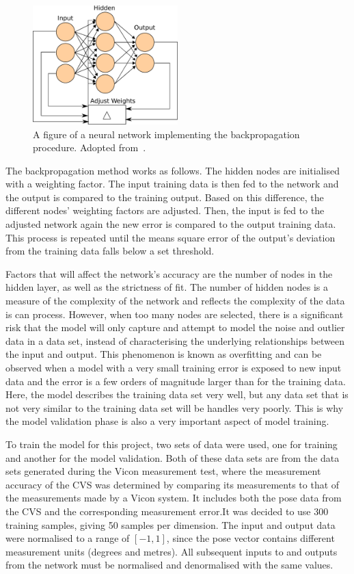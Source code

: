 \begin{figure}
  \centering
  \includegraphics[width=0.5\textwidth]{figures/chapter4/backpropagation}
  \caption[A figure of a neural network implementing the backpropagation procedure.]{A figure of a neural network implementing the backpropagation procedure. Adopted from~\cite{ann-wiki-pic}.}
\label{fig:chap4-backprogagation}
\end{figure}

The backpropagation method works as follows. The hidden nodes are initialised with a weighting factor. The input training data is then fed to the network and the output is compared to the training output. Based on this difference, the different nodes' weighting factors are adjusted. Then, the input is fed to the adjusted network again the new error is compared to the output training data. This process is repeated until the means square error of the output's deviation from the training data falls below a set threshold. 

Factors that will affect the network's accuracy are the number of nodes in the hidden layer, as well as the strictness of fit. The number of hidden nodes is a measure of the complexity of the network and reflects the complexity of the data is can process. However, when too many nodes are selected, there is a significant risk that the model will only capture and attempt to model the noise and outlier data in a data set, instead of characterising the underlying relationships between the input and output. This phenomenon is known as overfitting and can be observed when a model with a very small training error is exposed to new input data and the error is a few orders of magnitude larger than for the training data. Here, the model describes the training data set very well, but any data set that is not very similar to the training data set will be handles very poorly. This is why the model validation phase is also a very important aspect of model training. 

To train the model for this project, two sets of data were used, one for training and another for the model validation. Both of these data sets are from the data sets generated during the Vicon measurement test, where the measurement accuracy of the CVS was determined by comparing its measurements to that of the measurements made by a Vicon system. It includes both the pose data from the CVS and the corresponding measurement error.It was decided to use 300 training samples, giving 50 samples per dimension. The input and output data were normalised to a range of $[-1, 1]$, since the pose vector contains different measurement units (degrees and metres). All subsequent inputs to and outputs from the network must be normalised and denormalised with the same values.  

